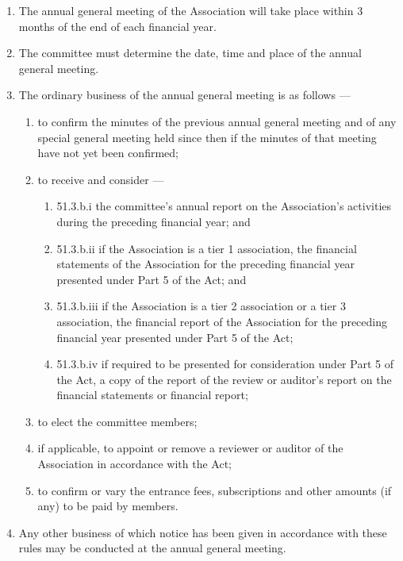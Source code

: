 \documentclass[../constitution.tex]{subfiles}
\begin{document}
\begin{enumerate}

\item The annual general meeting of the Association will take place within 3 months of the end of each financial year.
\item The committee must determine the date, time and place of the annual general meeting.
\item The ordinary business of the annual general meeting is as follows ---

  \begin{enumerate}
  
  \item to confirm the minutes of the previous annual general meeting and of any special general meeting held since then if the minutes of that meeting have not yet been confirmed;
  \item to receive and consider ---

    \begin{enumerate}
    
    \item 51.3.b.i the committee's annual report on the Association's activities during the preceding financial year; and
    \item 51.3.b.ii if the Association is a tier 1 association, the financial statements of the Association for the preceding financial year presented under Part 5 of the Act; and
    \item 51.3.b.iii if the Association is a tier 2 association or a tier 3 association, the financial report of the Association for the preceding financial year presented under Part 5 of the Act;
    \item 51.3.b.iv if required to be presented for consideration under Part 5 of the Act, a copy of the report of the review or auditor's report on the financial statements or financial report;
    \end{enumerate}
  \item to elect the committee members;
  \item if applicable, to appoint or remove a reviewer or auditor of the Association in accordance with the Act;
  \item to confirm or vary the entrance fees, subscriptions and other amounts (if any) to be paid by members.
  \end{enumerate}
\item Any other business of which notice has been given in accordance with these rules may be conducted at the annual general meeting.
\end{enumerate}
\end{document}
